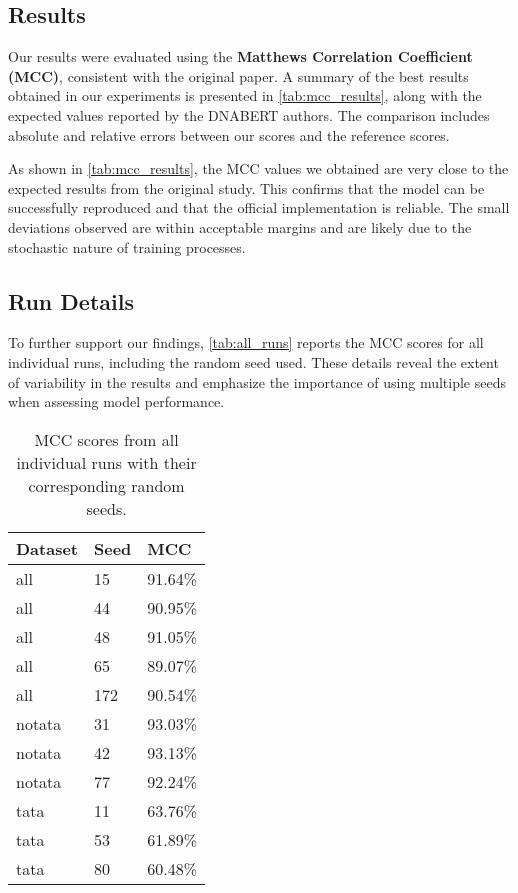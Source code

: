 \subsection{Results}

Our results were evaluated using the \textbf{Matthews Correlation Coefficient (MCC)}, consistent with the original paper. A summary of the best results obtained in our experiments is presented in \autoref{tab:mcc_results}, along with the expected values reported by the DNABERT authors. The comparison includes absolute and relative errors between our scores and the reference scores.

As shown in \autoref{tab:mcc_results}, the MCC values we obtained are very close to the expected results from the original study. This confirms that the model can be successfully reproduced and that the official implementation is reliable. The small deviations observed are within acceptable margins and are likely due to the stochastic nature of training processes.

\subsection{Run Details}

To further support our findings, \autoref{tab:all_runs} reports the MCC scores for all individual runs, including the random seed used. These details reveal the extent of variability in the results and emphasize the importance of using multiple seeds when assessing model performance.

\begin{table}[h!]
    \centering
    \begin{tabular}{|l|l|l|}
        \hline
        Dataset & Seed & MCC \\
        \hline
        all & 15 & 91.64\% \\
        all & 44 & 90.95\% \\
        all & 48 & 91.05\% \\
        all & 65 & 89.07\% \\
        all & 172 & 90.54\% \\
        notata & 31 & 93.03\% \\
        notata & 42 & 93.13\% \\
        notata & 77 & 92.24\% \\
        tata & 11 & 63.76\% \\
        tata & 53 & 61.89\% \\
        tata & 80 & 60.48\% \\
        \hline
    \end{tabular}
    \caption{MCC scores from all individual runs with their corresponding random seeds.}
    \label{tab:all_runs}
\end{table}


